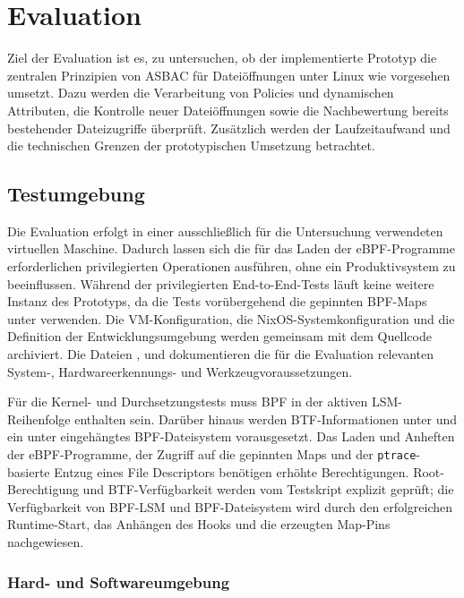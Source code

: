 \section{Evaluation}\label{sec:evaluation}
Ziel der Evaluation ist es, zu untersuchen, ob der implementierte Prototyp die zentralen Prinzipien von ASBAC für Dateiöffnungen unter Linux wie vorgesehen umsetzt. Dazu werden die Verarbeitung von Policies und dynamischen Attributen, die Kontrolle neuer Dateiöffnungen sowie die Nachbewertung bereits bestehender Dateizugriffe überprüft. Zusätzlich werden der Laufzeitaufwand und die technischen Grenzen der prototypischen Umsetzung betrachtet.

\subsection{Testumgebung}

Die Evaluation erfolgt in einer ausschließlich für die Untersuchung verwendeten virtuellen
Maschine. Dadurch lassen sich die für das Laden der eBPF-Programme erforderlichen privilegierten
Operationen ausführen, ohne ein Produktivsystem zu beeinflussen. Während der privilegierten
End-to-End-Tests läuft keine weitere Instanz des Prototyps, da die Tests vorübergehend die
gepinnten BPF-Maps unter \mbox{} verwenden. Die VM-Konfiguration, die
NixOS-Systemkonfiguration und die Definition der Entwicklungsumgebung werden gemeinsam mit dem
Quellcode archiviert. Die Dateien ,
 und  dokumentieren die
für die Evaluation relevanten System-, Hardwareerkennungs- und Werkzeugvoraussetzungen.

Für die Kernel- und Durchsetzungstests muss BPF in der aktiven LSM-Reihenfolge enthalten sein.
Darüber hinaus werden BTF-Informationen unter \mbox{} und ein unter
\mbox{}  eingehängtes BPF-Dateisystem vorausgesetzt. Das Laden und Anheften der
eBPF-Programme, der Zugriff auf die gepinnten Maps und der \texttt{ptrace}-basierte Entzug eines
File Descriptors benötigen erhöhte Berechtigungen. Root-Berechtigung und BTF-Verfügbarkeit werden
vom Testskript explizit geprüft; die Verfügbarkeit von BPF-LSM und BPF-Dateisystem wird durch den
erfolgreichen Runtime-Start, das Anhängen des Hooks und die erzeugten Map-Pins nachgewiesen.

\subsubsection{Hard- und Softwareumgebung}

